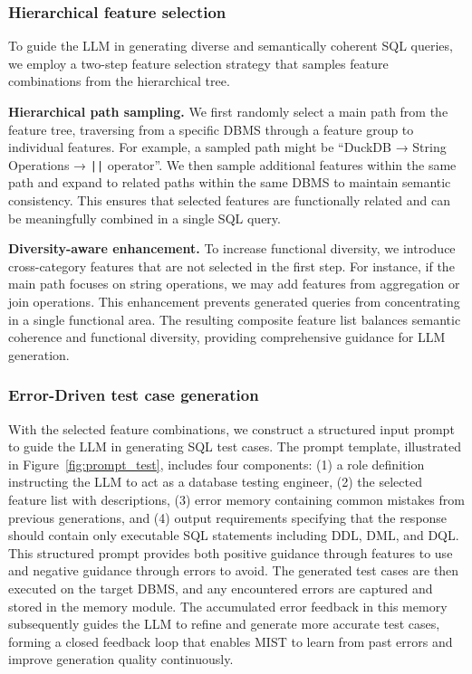 \subsubsection{Hierarchical feature selection}

To guide the LLM in generating diverse and semantically coherent SQL queries, we employ a two-step feature selection strategy that samples feature combinations from the hierarchical tree.

\textbf{Hierarchical path sampling.} We first randomly select a main path from the feature tree, traversing from a specific DBMS through a feature group to individual features. For example, a sampled path might be ``DuckDB → String Operations → \texttt{||} operator''. We then sample additional features within the same path and expand to related paths within the same DBMS to maintain semantic consistency. This ensures that selected features are functionally related and can be meaningfully combined in a single SQL query.

\textbf{Diversity-aware enhancement.} To increase functional diversity, we introduce cross-category features that are not selected in the first step. For instance, if the main path focuses on string operations, we may add features from aggregation or join operations. This enhancement prevents generated queries from concentrating in a single functional area. The resulting composite feature list balances semantic coherence and functional diversity, providing comprehensive guidance for LLM generation.

\subsubsection{Error-Driven test case generation}

With the selected feature combinations, we construct a structured input prompt to guide the LLM in generating SQL test cases. The prompt template, illustrated in Figure~\ref{fig:prompt_test}, includes four components: (1) a role definition instructing the LLM to act as a database testing engineer, (2) the selected feature list with descriptions, (3) error memory containing common mistakes from previous generations, and (4) output requirements specifying that the response should contain only executable SQL statements including DDL, DML, and DQL. This structured prompt provides both positive guidance through features to use and negative guidance through errors to avoid. The generated test cases are then executed on the target DBMS, and any encountered errors are captured and stored in the memory module. The accumulated error feedback in this memory subsequently guides the LLM to refine and generate more accurate test cases, forming a closed feedback loop that enables MIST to learn from past errors and improve generation quality continuously.

